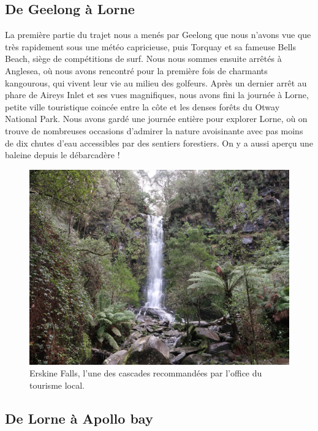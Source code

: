 \hypertarget{de-geelong-uxe0-lorne}{%
\subsection{De Geelong à Lorne}\label{de-geelong-uxe0-lorne}}

La première partie du trajet nous a menés par Geelong que nous n'avons
vue que très rapidement sous une météo capricieuse, puis Torquay et sa
fameuse Bells Beach, siège de compétitions de surf. Nous nous sommes
ensuite arrêtés à Anglesea, où nous avons rencontré pour la première
fois de charmants kangourous, qui vivent leur vie au milieu des
golfeurs. Après un dernier arrêt au phare de Aireys Inlet et ses vues
magnifiques, nous avons fini la journée à Lorne, petite ville
touristique coincée entre la côte et les denses forêts du Otway National
Park. Nous avons gardé une journée entière pour explorer Lorne, où on
trouve de nombreuses occasions d'admirer la nature avoisinante avec pas
moins de dix chutes d'eau accessibles par des sentiers forestiers. On y
a aussi aperçu une baleine depuis le débarcadère !

\begin{figure}
\centering
\includegraphics{images/20180731_erskinefalls.JPG}
\caption{Erskine Falls, l'une des cascades recommandées par l'office du
tourisme local.}
\end{figure}

\hypertarget{de-lorne-uxe0-apollo-bay}{%
\subsection{De Lorne à Apollo bay}\label{de-lorne-uxe0-apollo-bay}}

